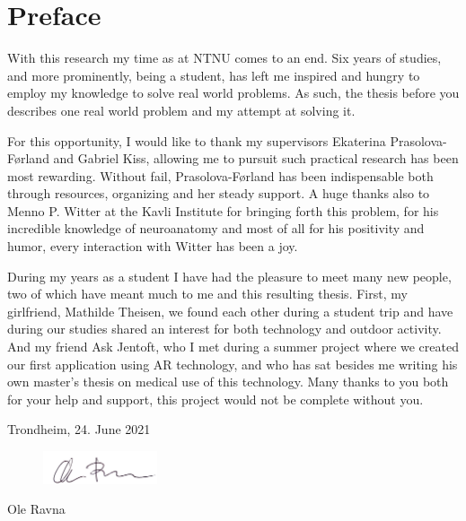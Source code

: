 \section*{Preface}



With this research my time as at NTNU comes to an end. Six years of studies, and more prominently, being a student, has left me inspired and hungry to employ my knowledge to solve real world problems. As such, the thesis before you describes one real world problem and my attempt at solving it.

For this opportunity, I would like to thank my supervisors Ekaterina Prasolova-Førland and Gabriel Kiss, allowing me to pursuit such practical research has been most rewarding. Without fail, Prasolova-Førland has been indispensable both through resources, organizing and her steady support. 
A huge thanks also to Menno P. Witter at the Kavli Institute for bringing forth this problem, for his incredible knowledge of neuroanatomy and most of all for his positivity and humor, every interaction with Witter has been a joy. 

During my years as a student I have had the pleasure to meet many new people, two of which have meant much to me and this resulting thesis. First, my girlfriend, Mathilde Theisen, we found each other during a student trip and have during our studies shared an interest for both technology and outdoor activity. And my friend Ask Jentoft, who I met during a summer project where we created our first application using AR technology, and who has sat besides me writing his own master's thesis on medical use of this technology. Many thanks to you both for your help and support, this project would not be complete without you.\\[2cm]


\begin{center}
Trondheim, 24. June 2021 \\[1pc]
\begin{figure}[H]
    \centering
    \includegraphics[width=0.3\textwidth , trim={0 0 0 0}, clip]{fig/ravnasign}
\end{figure}
Ole Ravna
\end{center}